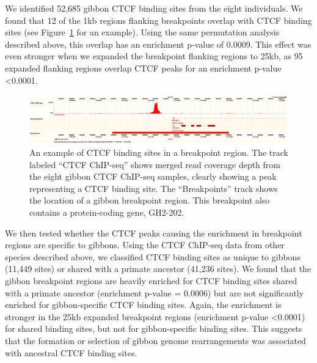 We identified 52,685 gibbon CTCF binding sites from the eight individuals. We found that 12 of the 1kb regions flanking breakpoints overlap with CTCF binding sites (see Figure~\ref{example_ctcf_breakpoint} for an example). Using the same permutation analysis described above, this overlap has an enrichment p-value of 0.0009. This effect was even stronger when we expanded the breakpoint flanking regions to 25kb, as 95 expanded flanking regions overlap CTCF peaks for an enrichment p-value <0.0001.

\begin{figure}
\centering
\includegraphics[width=1\textwidth]{figures/merged_CTCF_GL397331.pdf}
\caption{An example of CTCF binding sites in a breakpoint region. The track labeled ``CTCF ChIP-seq'' shows merged read coverage depth from the eight gibbon CTCF ChIP-seq samples, clearly showing a peak representing a CTCF binding site. The ``Breakpoints'' track shows the location of a gibbon breakpoint region. This breakpoint also contains a protein-coding gene, GH2-202.}
\label{example_ctcf_breakpoint}
\end{figure}

We then tested whether the CTCF peaks causing the enrichment in breakpoint regions are specific to gibbons. Using the CTCF ChIP-seq data from other species described above, we classified CTCF binding sites as unique to gibbons (11,449 sites) or shared with a primate ancestor (41,236 sites). We found that the gibbon breakpoint regions are heavily enriched for CTCF binding sites shared with a primate ancestor (enrichment p-value = 0.0006) but are not significantly enriched for gibbon-specific CTCF binding sites. Again, the enrichment is stronger in the 25kb expanded breakpoint regions (enrichment p-value <0.0001) for shared binding sites, but not for gibbon-specific binding sites. This suggests that the formation or selection of gibbon genome rearrangements was associated with ancestral CTCF binding sites.


